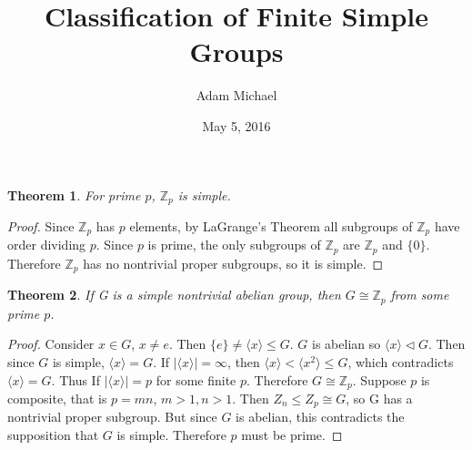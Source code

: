 \documentclass[a4paper]{article}
\title{Classification of Finite Simple Groups}
\author{Adam Michael}
\date{May 5, 2016}
\begin{document}
\maketitle

\newtheorem{theorem}{Theorem}

\begin{theorem}For prime $p$, $\mathbb{Z}_p$ is simple.
\end{theorem}
\begin{proof}
Since $\mathbb{Z}_p$ has $p$ elements, by LaGrange's Theorem all subgroups of $\mathbb{Z}_p$ have order dividing $p$. Since $p$ is prime, the only subgroups of $\mathbb{Z}_p$ are $\mathbb{Z}_p$ and $\{0\}$. Therefore $\mathbb{Z}_p$ has no nontrivial proper subgroups, so it is simple.
\end{proof}

\begin{theorem}If G is a simple nontrivial abelian group, then $G \cong \mathbb{Z}_p$ from some prime $p$.
\end{theorem}
\begin{proof}
Consider $x \in G$, $x \neq e$. Then $\{ e \} \neq \langle x \rangle \le G$. $G$ is abelian so $\langle x \rangle \triangleleft G$. Then since $G$ is simple, $\langle x \rangle = G$. If $|\langle x \rangle| = \infty$, then $\langle x \rangle < \langle x^2 \rangle \leq G$, which contradicts $\langle x \rangle = G$. Thus If $|\langle x \rangle| = p$ for some finite $p$. Therefore $G \cong \mathbb{Z}_p$. Suppose $p$ is composite, that is $p = m n$, $m > 1, n > 1$. Then $Z_n \leq Z_p \cong G$, so G has a nontrivial proper subgroup. But since $G$ is abelian, this contradicts the supposition that $G$ is simple. Therefore $p$ must be prime.
\end{proof}
\end{document}

